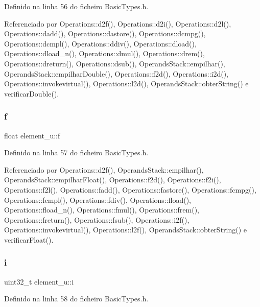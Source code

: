 Definido na linha 56 do ficheiro Basic\+Types.\+h.



Referenciado por Operations\+::d2f(), Operations\+::d2i(), Operations\+::d2l(), Operations\+::dadd(), Operations\+::dastore(), Operations\+::dcmpg(), Operations\+::dcmpl(), Operations\+::ddiv(), Operations\+::dload(), Operations\+::dload\+\_\+n(), Operations\+::dmul(), Operations\+::drem(), Operations\+::dreturn(), Operations\+::dsub(), Operands\+Stack\+::empilhar(), Operands\+Stack\+::empilhar\+Double(), Operations\+::f2d(), Operations\+::i2d(), Operations\+::invokevirtual(), Operations\+::l2d(), Operands\+Stack\+::obter\+String() e verificar\+Double().

\mbox{\label{unionelement__u_ad3caae754d93e7fa606a0756f5ddc6a6}} 
\subsubsection{\texorpdfstring{f}{f}}
{\footnotesize\ttfamily float element\+\_\+u\+::f}



Definido na linha 57 do ficheiro Basic\+Types.\+h.



Referenciado por Operations\+::d2f(), Operands\+Stack\+::empilhar(), Operands\+Stack\+::empilhar\+Float(), Operations\+::f2d(), Operations\+::f2i(), Operations\+::f2l(), Operations\+::fadd(), Operations\+::fastore(), Operations\+::fcmpg(), Operations\+::fcmpl(), Operations\+::fdiv(), Operations\+::fload(), Operations\+::fload\+\_\+n(), Operations\+::fmul(), Operations\+::frem(), Operations\+::freturn(), Operations\+::fsub(), Operations\+::i2f(), Operations\+::invokevirtual(), Operations\+::l2f(), Operands\+Stack\+::obter\+String() e verificar\+Float().

\mbox{\label{unionelement__u_ac1564bf5b02b69382469449ba266dc9a}} 
\subsubsection{\texorpdfstring{i}{i}}
{\footnotesize\ttfamily uint32\+\_\+t element\+\_\+u\+::i}



Definido na linha 58 do ficheiro Basic\+Types.\+h.



